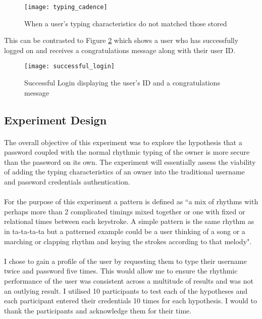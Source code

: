 \documentclass{article}
\begin{document}
\begin{figure}[H]
    \centering
    \texttt{[image: typing\_cadence]}
    \caption{When a user's typing characteristics do not matched those stored}
    \label{fig:typing_cadence}
\end{figure}

This can be contrasted to Figure \ref{fig:successful_login} which shows a user who has successfully logged on and receives a congratulations message along with their user ID.

\begin{figure}[H]
    \centering
    \texttt{[image: successful\_login]}
    \caption{Successful Login displaying the user's ID and a congratulations message}
    \label{fig:successful_login}
\end{figure}

\subsection{Experiment Design}
\paragraph{}
The overall objective of this experiment was to explore the hypothesis that a password coupled with the normal rhythmic typing of the owner is more secure than the password on its own. The experiment will essentially assess the viability of adding the typing characteristics of an owner into the traditional username and password credentials authentication. 

\paragraph{}
For the purpose of this experiment a pattern is defined as ``a mix of rhythms with perhaps more than 2 complicated timings mixed together or one with fixed or relational times between each keystroke. A simple pattern is the same rhythm as in ta-ta-ta-ta but a patterned example could be a user thinking of a song or a marching or clapping rhythm and keying the strokes according to that melody". 

\paragraph{}
I chose to gain a profile of the user by requesting them to type their username twice and password five times. This would allow me to ensure the rhythmic performance of the user was consistent across a multitude of results and was not an outlying result. I utilised 10 participants to test each of the hypotheses and each participant entered their credentials 10 times for each hypothesis. I would to thank the participants and acknowledge them for their time.
\end{document}
